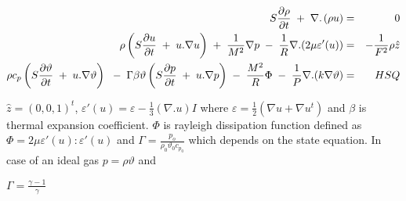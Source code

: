 \documentclass[11pt,a4paper]{article}
\begin{document}
\begin{eqnarray}
S\frac{\partial \rho}{\partial t}\hspace{1mm}+\hspace{1mm}\nabla.\hspace{0.5mm}(\rho u) &=& 0 \\
\rho \left( S \frac{\partial u}{\partial t}\hspace{1mm}+\hspace{1mm}u.\nabla u \right)\hspace{1mm}+\hspace{1mm}\frac{1}{M^2} \nabla p\hspace{1mm}-\hspace{1mm}\frac{1}{R}\nabla. (2\mu\varepsilon'(u)) &=& -\frac{1}{F^2}\rho\hat{z} \\
\rho c_p \left( S \frac{\partial \vartheta}{\partial t}\hspace{1mm}+\hspace{1mm}u.\nabla \vartheta \right)\hspace{1mm}\hspace{1mm}-\hspace{1mm}\Gamma\beta\vartheta \left( S \frac{\partial p}{\partial t}\hspace{1mm}+\hspace{1mm}u.\nabla p \right)\hspace{1mm}-\hspace{1mm}\frac{M^2}{R}\Phi\hspace{1mm}-\hspace{1mm}\frac{1}{P}\nabla.(k\nabla\vartheta) &=& HSQ
\end{eqnarray}


$\hat{z}=(0,0,1)^t$, $\varepsilon'(u)=\varepsilon-\frac{1}{3}(\nabla.u)I$ where $\varepsilon=\frac{1}{2}(\nabla u+\nabla u^t)$ and $\beta$ is thermal expansion coefficient. $\Phi$ is rayleigh dissipation function defined as $\Phi=2\mu\varepsilon'(u):\varepsilon'(u)$ and $\Gamma=\frac{p_o}{\rho_0\vartheta_0c_{p_0}}$ which depends on the state equation. In case of an ideal gas $p=\rho\vartheta$ and 

$\Gamma=\frac{\gamma-1}{\gamma}$
\end{document}
